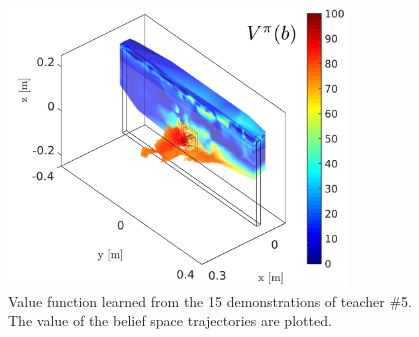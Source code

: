 \begin{figure}
 \centering
 \includegraphics[width=0.8\textwidth]{./ch4-PiH/Figures/Fig/value_subj_5.pdf}
 \caption{Value function learned from the 15 demonstrations of teacher \#5. The value of the belief space trajectories are plotted.}
 \label{fig:value_function_subj_5}
\end{figure}
 
